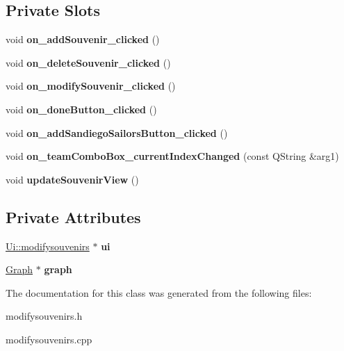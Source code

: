 \subsection*{Private Slots}
\begin{DoxyCompactItemize}
\item 
\mbox{\label{classmodifysouvenirs_ab06c14688d7494cb7ce9cf2fbe44af28}} 
void {\bfseries on\+\_\+add\+Souvenir\+\_\+clicked} ()
\item 
\mbox{\label{classmodifysouvenirs_ace1bd0c05652f2d229f927db537a8d34}} 
void {\bfseries on\+\_\+delete\+Souvenir\+\_\+clicked} ()
\item 
\mbox{\label{classmodifysouvenirs_a519bd0776e2e27409672cfe8ec01c028}} 
void {\bfseries on\+\_\+modify\+Souvenir\+\_\+clicked} ()
\item 
\mbox{\label{classmodifysouvenirs_af634b7e0b13202888e488eca427dcbe3}} 
void {\bfseries on\+\_\+done\+Button\+\_\+clicked} ()
\item 
\mbox{\label{classmodifysouvenirs_acf60b19ef0276764bc649d0cfb641a60}} 
void {\bfseries on\+\_\+add\+Sandiego\+Sailors\+Button\+\_\+clicked} ()
\item 
\mbox{\label{classmodifysouvenirs_afdce02d3ffbbd2f00cbb100816ec831e}} 
void {\bfseries on\+\_\+team\+Combo\+Box\+\_\+current\+Index\+Changed} (const Q\+String \&arg1)
\item 
\mbox{\label{classmodifysouvenirs_a70369cade8961963f7e98d59dea124df}} 
void {\bfseries update\+Souvenir\+View} ()
\end{DoxyCompactItemize}
\subsection*{Private Attributes}
\begin{DoxyCompactItemize}
\item 
\mbox{\label{classmodifysouvenirs_a91d4c3a315d423d8c0493bb16b298967}} 
\hyperlink{class_ui_1_1modifysouvenirs}{Ui\+::modifysouvenirs} $\ast$ {\bfseries ui}
\item 
\mbox{\label{classmodifysouvenirs_af69425e84f9683db36153e2b97ec5313}} 
\hyperlink{class_graph}{Graph} $\ast$ {\bfseries graph}
\end{DoxyCompactItemize}


The documentation for this class was generated from the following files\+:\begin{DoxyCompactItemize}
\item 
modifysouvenirs.\+h\item 
modifysouvenirs.\+cpp\end{DoxyCompactItemize}
